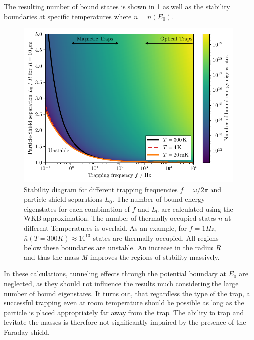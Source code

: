 The resulting number of bound states is shown in \cref{fig:4:trap-stability} as well as the stability boundaries at specific temperatures where $\bar{n} = n(E_0)$.
\begin{figure}[!htbp]
  \centering
  \includegraphics[width=\textwidth]{./../figures/others/trap-stability-with-R.pdf}
  \caption{Stability diagram for different trapping frequencies $f = \omega/2\pi$ and particle-shield separations $L_0$. The number of bound energy-eigenstates for each combination of $f$ and $L_0$ are calculated using the WKB-approximation. The number of thermally occupied states $\bar{n}$ at different Temperatures is overlaid. As an example, for $f=1\si{Hz}$, $\bar{n}(T=300\si{K})\approx 10^{13}$ states are thermally occupied. All regions below these boundaries are unstable. An increase in the radius $R$ and thus the mass $M$ improves the regions of stability massively.}
  \label{fig:4:trap-stability}
\end{figure}
In these calculations, tunneling effects through the potential boundary at $E_0$ are neglected, as they should not influence the results much considering the large number of bound eigenstates.
It turns out, that regardless the type of the trap, a successful trapping even at room temperature should be possible as long as the particle is placed appropriately far away from the trap.
The ability to trap and levitate the masses is therefore not significantly impaired by the presence of the Faraday shield.